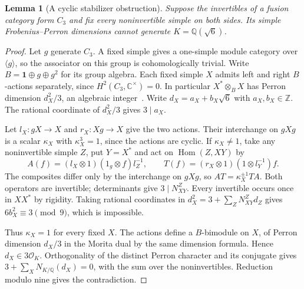 \documentclass[11pt,reqno]{amsart}
\newtheorem{lemma}[theorem]{Lemma}
\theoremstyle{remark}\newtheorem{remark}[theorem]{Remark}
\numberwithin{equation}{section}
\begin{document}
\begin{lemma}[A cyclic stabilizer obstruction]\label{lem:r6-fixed-cyclic-dimensions}
Suppose the invertibles of a fusion category form $C_3$ and fix every
noninvertible simple on both sides. Its simple Frobenius--Perron
dimensions cannot generate $K=\mathbb Q(\sqrt6)$.
\end{lemma}
\begin{proof}
Let $g$ generate $C_3$. A fixed simple gives a one-simple module
category over $\langle g\rangle$, so the associator on this group is
cohomologically trivial. Write $B=\mathbf1\oplus g\oplus g^2$
for its group algebra. Each fixed simple $X$ admits left and right
$B$-actions separately, since $H^2(C_3,\mathbb C^\times)=0$.
In particular $X^*\otimes_B X$ has Perron dimension $d_X^2/3$,
an algebraic integer~\cite[Exercises~7.16.8--7.16.9]{EGNO}. Write
$d_X=a_X+b_X\sqrt6$ with $a_X,b_X\in\mathbb Z$. The rational
coordinate of $d_X^2/3$ gives $3\mid a_X$.

Let $l_X:gX\to X$ and $r_X:Xg\to X$ give the two actions.
Their interchange on $gXg$ is a scalar $\kappa_X$ with
$\kappa_X^3=1$, since the actions are cyclic. If $\kappa_X\ne1$,
take any noninvertible simple $Z$, put $Y=X^*$ and act on
$\operatorname{Hom}(Z,XY)$ by
\[
 A(f)=(l_X\otimes1)(1_g\otimes f)l_Z^{-1},\qquad
 T(f)=(r_X\otimes1)(1\otimes l_Y^{-1})f .
\]
The composites differ only by the interchange on $gXg$, so
$AT=\kappa_X^{\pm1}TA$. Both operators are invertible; determinants
give $3\mid N_{XY}^Z$. Every invertible occurs once in $XX^*$ by
rigidity. Taking rational coordinates in
$d_X^2=3+\sum_Z N_{XY}^Z d_Z$ gives $6b_X^2\equiv3\pmod9$,
which is impossible.

Thus $\kappa_X=1$ for every fixed $X$. The actions define a
$B$-bimodule on $X$, of Perron dimension $d_X/3$ in the Morita
dual by the same dimension formula. Hence $d_X\in3\mathcal O_K$.
Orthogonality of the distinct Perron character and its conjugate
gives $3+\sum_X N_{K/\mathbb Q}(d_X)=0$, with the sum over the
noninvertibles. Reduction modulo nine gives the contradiction.
\end{proof}
\end{document}
